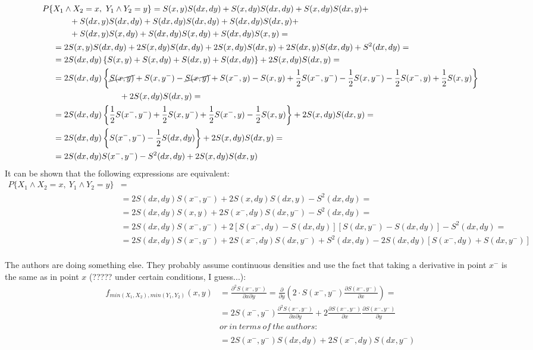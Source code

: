 \documentclass[]{article}
\begin{document}
  $$
  \begin{aligned}
P\{ &X_{1}\wedge X_{2} = x,~Y_{1}\wedge Y_{2} = y \} 
      = S(x,y)S(dx, dy) +  S(x,dy)S(dx, dy) + S(x,dy)S(dx, y) + \\
      &~~~~~~+ S(dx,y)S(dx, dy) +  S(dx,dy)S(dx, dy) + S(dx,dy)S(dx, y) + \\
      &~~~~~~+ S(dx,y)S(x, dy) +  S(dx,dy)S(x, dy) + S(dx,dy)S(x, y) = \\
      &= 2S(x,y)S(dx, dy) +  2S(x,dy)S(dx, dy) + 2S(x,dy)S(dx, y) + 2S(dx,y)S(dx, dy) +  S^2(dx,dy) = \\
      &= 2S(dx, dy)\left\{S(x,y) +  S(x,dy) + S(dx,y) +  S(dx,dy)\right\}  + 2S(x,dy)S(dx, y)= \\
      &= 2S(dx, dy)\left\{\cancel{S(x,y)} +  S(x,y^-) - \cancel{S(x,y)} + S(x^-,y) - S(x,y) +  \frac{1}{2}S(x^-,y^-) - \frac{1}{2}S(x,y^-) - \frac{1}{2}S(x^-,y) + \frac{1}{2}S(x,y)\right\}\\
      &~~~~~~~~~~~~~~~~~~~~~~~~  + 2S(x,dy)S(dx, y)= \\
      &= 2S(dx, dy)\left\{\frac{1}{2}S(x^-,y^-)  + \frac{1}{2}S(x,y^-)  + \frac{1}{2}S(x^-,y) - \frac{1}{2}S(x,y)\right\} + 2S(x,dy)S(dx, y) =\\
      &= 2S(dx, dy)\left\{ S(x^-,y^-) -\frac{1}{2}S(dx,dy)\right\} + 2S(x,dy)S(dx, y) =\\
      &= 2S(dx, dy) S(x^-,y^-) -S^2(dx,dy) + 2S(x,dy)S(dx, y)\\
	\end{aligned}
	$$
  It can be shown that the following expressions are equivalent:
  $$
  \begin{aligned}
P\{ X_{1}\wedge X_{2} = x,~Y_{1}\wedge Y_{2} = y \}  &=  &\\
      &= 2S(dx, dy)S(x^-,y^-) + 2S(x,dy)S(dx, y) -S^2(dx,dy)= \\
      &= 2S(dx, dy)S(x,y)+ 2S(x^-,dy)S(dx, y^-)  -S^2(dx,dy)=\\
      &= 2S(dx, dy)S(x^-,y^-) + 2[S(x^-,dy)-S(dx,dy)][S(dx, y^-)-S(dx,dy)]  -S^2(dx,dy)=\\
      &= 2S(dx, dy)S(x^-,y^-) + 2S(x^-,dy)S(dx, y^-) + S^2(dx,dy) - 2S(dx,dy)[S(x^-,dy)+S(dx, y^-)]\\
	\end{aligned}
	$$

  The authors are doing something else. They probably assume continuous densities and use the fact that taking a derivative in point $x^-$ is the same as in point $x$ (????? under certain conditions, I guess...):
	$$
	\begin{aligned}
    f_{min(X_1, X_2),min(Y_1, Y_2)}(x, y) &= \frac{\partial^2 S(x^-, y^-)}{\partial x \partial y} = \frac{\partial}{\partial y} \left(2\cdot S(x^-, y^-) \frac{\partial S(x^-, y^-)}{\partial x}  \right)  =\\
     &=2S(x^-, y^-) \frac{\partial^2 S(x^-, y^-)}{\partial x \partial y}   + 2 \frac{\partial S(x^-, y^-)}{\partial x}\frac{\partial S(x^-, y^-)}{\partial y}\\
     & or~in~terms~of~the~authors:\\
     &~\\
     &= 2 S(x^-, y^-) S(dx, dy) + 2 S(x^-, dy) S(dx, y^-)
	\end{aligned}
	$$
\end{document}
